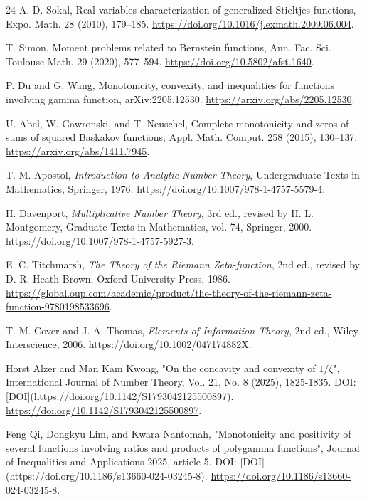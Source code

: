 \documentclass[11pt]{article}
\numberwithin{equation}{section}
\theoremstyle{definition}
\theoremstyle{remark}
\newcommand{\1}{\mathbf 1}
\begin{document}
\begin{thebibliography}{24}
A. D. Sokal,
\newblock Real-variables characterization of generalized Stieltjes functions,
\newblock Expo. Math. 28 (2010), 179--185.
\url{https://doi.org/10.1016/j.exmath.2009.06.004}.

T. Simon,
\newblock Moment problems related to Bernstein functions,
\newblock Ann. Fac. Sci. Toulouse Math. 29 (2020), 577--594.
\url{https://doi.org/10.5802/afst.1640}.

P. Du and G. Wang,
\newblock Monotonicity, convexity, and inequalities for functions involving
  gamma function,
\newblock arXiv:2205.12530.
\url{https://arxiv.org/abs/2205.12530}.

U. Abel, W. Gawronski, and T. Neuschel,
\newblock Complete monotonicity and zeros of sums of squared Baskakov
  functions,
\newblock Appl. Math. Comput. 258 (2015), 130--137.
\url{https://arxiv.org/abs/1411.7945}.

T. M. Apostol,
\emph{Introduction to Analytic Number Theory},
Undergraduate Texts in Mathematics, Springer, 1976.
\url{https://doi.org/10.1007/978-1-4757-5579-4}.

H. Davenport,
\emph{Multiplicative Number Theory},
3rd ed., revised by H. L. Montgomery, Graduate Texts in Mathematics, vol. 74, Springer, 2000.
\url{https://doi.org/10.1007/978-1-4757-5927-3}.

E. C. Titchmarsh,
\emph{The Theory of the Riemann Zeta-function},
2nd ed., revised by D. R. Heath-Brown, Oxford University Press, 1986.
\url{https://global.oup.com/academic/product/the-theory-of-the-riemann-zeta-function-9780198533696}.

T. M. Cover and J. A. Thomas,
\emph{Elements of Information Theory},
2nd ed., Wiley-Interscience, 2006.
\url{https://doi.org/10.1002/047174882X}.

Horst Alzer and Man Kam Kwong, "On the concavity and convexity of \(1/\zeta\)", International Journal of Number Theory, Vol. 21, No. 8 (2025), 1825-1835. DOI: [DOI](https://doi.org/10.1142/S1793042125500897).
\url{https://doi.org/10.1142/S1793042125500897}.

Feng Qi, Dongkyu Lim, and Kwara Nantomah, "Monotonicity and positivity of several functions involving ratios and products of polygamma functions", Journal of Inequalities and Applications 2025, article 5. DOI: [DOI](https://doi.org/10.1186/s13660-024-03245-8).
\url{https://doi.org/10.1186/s13660-024-03245-8}.


\end{thebibliography}
\end{document}
